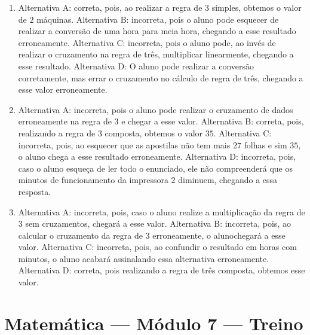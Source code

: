 \begin{enumerate}
\item Alternativa A: correta, pois, ao realizar a regra de $3$ simples, obtemos
o valor de $2$ máquinas.
Alternativa B: incorreta, pois o aluno pode esquecer de realizar a
conversão de uma hora para meia hora, chegando a esse resultado
erroneamente.
Alternativa C: incorreta, pois o aluno pode, ao invés de realizar o
cruzamento na regra de três, multiplicar linearmente, chegando a esse
resultado.
Alternativa D: O aluno pode realizar a conversão corretamente, mas errar
o cruzamento no cálculo de regra de três, chegando a esse valor
erroneamente.

\item Alternativa A: incorreta, pois o aluno pode realizar o cruzamento de
dados erroneamente na regra de $3$ e chegar a esse valor.
Alternativa B: correta, pois, realizando a regra de $3$ composta, obtemos
o valor $35$.
Alternativa C: incorreta, pois, ao esquecer que as apostilas não tem
mais $27$ folhas e sim $35$, o aluno chega a esse resultado erroneamente.
Alternativa D: incorreta, pois, caso o aluno esqueça de ler todo o
enunciado, ele não compreenderá que os minutos de funcionamento da
impressora $2$ diminuem, chegando a essa resposta.

\item Alternativa A: incorreta, pois, caso o aluno realize a multiplicação da
regra de $3$ sem cruzamentos, chegará a esse valor.
Alternativa B: incorreta, pois, ao calcular o cruzamento da regra de $3$
erroneamente, o alunochegará a esse valor.
Alternativa C: incorreta, pois, ao confundir o resultado em horas com
minutos, o aluno acabará assinalando essa alternativa erroneamente.
Alternativa D: correta, pois realizando a regra de três composta,
obtemos esse valor.
\end{enumerate}

\section*{Matemática — Módulo 7 — Treino}

